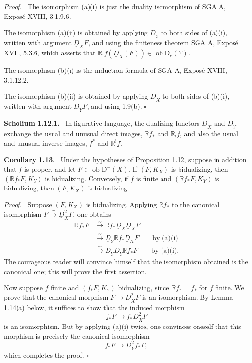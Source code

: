 \documentclass[11pt]{article}
\providecommand{\qedtext}{\hfill$\square$}
\newenvironment{statement}[1]{\par\medskip\noindent\textbf{#1.}\ }{\par\medskip}
\newenvironment{prooftext}[1][Proof]{\par\noindent\emph{#1.}\ }{\par\medskip}
\newcommand{\D}{\mathrm{D}}
\newcommand{\ob}{\operatorname{ob}}
\providecommand{\ob}{\operatorname{ob}}
\providecommand{\qedtext}{\hfill$\square$}
\begin{document}
\begin{prooftext}
The isomorphism (a)(i) is just the duality isomorphism of SGA A, Exposé XVIII, 3.1.9.6.

The isomorphism (a)(ii) is obtained by applying $\underline D_Y$ to both sides of (a)(i), written with argument $\underline D_XF$, and using the finiteness theorem SGA A, Exposé XVII, 5.3.6, which asserts that $\mathbb{R}_!f(\underline D_X(F))\in\ob\D_c(Y)$.

The isomorphism (b)(i) is the induction formula of SGA A, Exposé XVIII, 3.1.12.2.

The isomorphism (b)(ii) is obtained by applying $\underline D_X$ to both sides of (b)(i), written with argument $\underline D_YF$, and using 1.9(b). \qedtext
\end{prooftext}

\begin{statement}{Scholium 1.12.1}
In figurative language, the dualizing functors $\underline D_X$ and $\underline D_Y$ exchange the usual and unusual direct images, $\mathbb{R} f_*$ and $\mathbb{R}_!f$, and also the usual and unusual inverse images, $f^*$ and $\mathbb{R}^!f$.
\end{statement}

\begin{statement}{Corollary 1.13}
Under the hypotheses of Proposition 1.12, suppose in addition that $f$ is proper, and let $F\in\ob\D^-(X)$. If $(F,K_X)$ is bidualizing, then $(\mathbb{R} f_*F,K_Y)$ is bidualizing. Conversely, if $f$ is finite and $(\mathbb{R} f_*F,K_Y)$ is bidualizing, then $(F,K_X)$ is bidualizing.
\end{statement}

\begin{prooftext}
Suppose $(F,K_X)$ is bidualizing. Applying $\mathbb{R} f_*$ to the canonical isomorphism $F\xrightarrow{\sim}\underline D_X^2F$, one obtains
\begin{align*}
\mathbb{R} f_*F &\xrightarrow{\sim}\mathbb{R} f_*\underline D_X\underline D_XF \\
&\xrightarrow{\sim}\underline D_Y\mathbb{R} f_*\underline D_XF \qquad \text{by (a)(i)}\\
&\xrightarrow{\sim}\underline D_Y\underline D_Y\mathbb{R} f_*F \qquad \text{by (a)(i)}.
\end{align*}
The courageous reader will convince himself that the isomorphism obtained is the canonical one; this will prove the first assertion.

Now suppose $f$ finite and $(f_*F,K_Y)$ bidualizing, since $\mathbb{R} f_*=f_*$ for $f$ finite. We prove that the canonical morphism $F\to\underline D_X^2F$ is an isomorphism. By Lemma 1.14(a) below, it suffices to show that the induced morphism
\[
   f_*F\longrightarrow f_*\underline D_X^2F
\]
is an isomorphism. But by applying (a)(i) twice, one convinces oneself that this morphism is precisely the canonical isomorphism
\[
   f_*F\longrightarrow \underline D_Y^2f_*F,
\]
which completes the proof. \qedtext
\end{prooftext}
\end{document}
